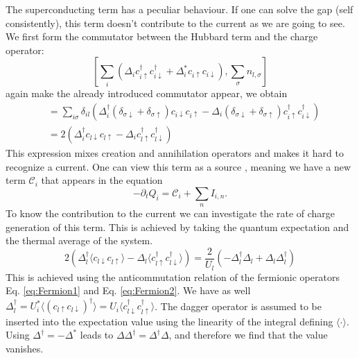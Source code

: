 \documentclass[../main.tex]{subfile}
\begin{document}
 The superconducting term has a peculiar behaviour. If one can solve the gap (self consistently), this term 
doesn't contribute to the current as we are going to see. We first form the commutator between the Hubbard term and the charge operator:
\begin{equation*}
        \left[\sum_i\left(\Delta_i c_{i\uparrow}^{\dagger}c_{i\downarrow}^{\dagger} + 
        \Delta_i^{\ast} c_{i\uparrow}c_{i\downarrow}\right) , \sum_{\sigma} n_{l,\sigma}\right]
\end{equation*}
again make the already introduced commutator appear, we obtain
\begin{equation*}
    \begin{aligned}
    &= \sum_{i\sigma} \delta_{il}\left(\Delta_i^{\dagger} (\delta_{\sigma\downarrow} + \delta_{\sigma\uparrow})c_{i\downarrow}c_{i\uparrow} 
    -\Delta_i(\delta_{\sigma\downarrow} + \delta_{\sigma\uparrow})c_{i\uparrow}^{\dagger} c_{i\downarrow}^{\dagger}\right)\\
    &= 2 \left( \Delta_i^{\dagger} c_{l\downarrow}c_{l\uparrow} - \Delta_i c_{l\uparrow}^{\dagger}c_{l\downarrow}^{\dagger}\right)
    \end{aligned}
\end{equation*}
This expression mixes creation and annihilation operators and makes it hard to recognize a current. One can view this term as a 
source \cite{Risinggaard2019}, meaning we have a new term $\mathcal{C}_i$ that appears in the equation  
\[
    -\partial_t Q_i = \mathcal{C}_i +  \sum_n I_{i,n}  .
\]
To know the contribution to the current we can investigate the rate of charge generation of this term. This is achieved by taking the quantum
expectation and the thermal average of the system.
\[
    2 \left( \Delta_l^{\dagger}\langle c_{l\downarrow}c_{l\uparrow}\rangle - \Delta_l \langle c_{l\uparrow}^{\dagger}c_{l\downarrow}^{\dagger}\rangle\right)
    = \frac{2}{U_l}\left(-\Delta_l^{\dagger}\Delta_l + \Delta_l \Delta_l^{\dagger}\right)
\]
This is achieved using the anticommutation relation of the fermionic operators Eq. \ref{eq:Fermion1} and Eq. \ref{eq:Fermion2}. 
We have as well $\Delta_l^{\dagger} = U_i^{\ast} \langle(c_{l\uparrow}c_{l\downarrow})^{\dagger}\rangle = U_i \langle c_{l\downarrow}^{\dagger} c_{l\uparrow}^{\dagger}\rangle$.
The dagger operator is assumed to be inserted into the expectation value using the linearity of the integral defining $\langle \cdot\rangle$.
Using $\Delta^{\dagger} = -\Delta^{\ast}$ leads to $\Delta\Delta^{\dagger} = \Delta^{\dagger}\Delta$, and therefore we find that the value vanishes.
\end{document}
